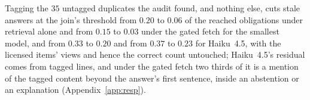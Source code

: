 
Tagging the $35$ untagged duplicates the audit found, and nothing else, cuts stale answers at the join's threshold from $0.20$ to $0.06$ of the reached obligations under retrieval alone and from $0.15$ to $0.03$ under the gated fetch for the smallest model, and from $0.33$ to $0.20$ and from $0.37$ to $0.23$ for Haiku~4.5, with the licensed items' views and hence the correct count untouched; Haiku~4.5's residual comes from tagged lines, and under the gated fetch two thirds of it is a mention of the tagged content beyond the answer's first sentence, inside an abstention or an explanation (Appendix~\ref{app:resp}).

